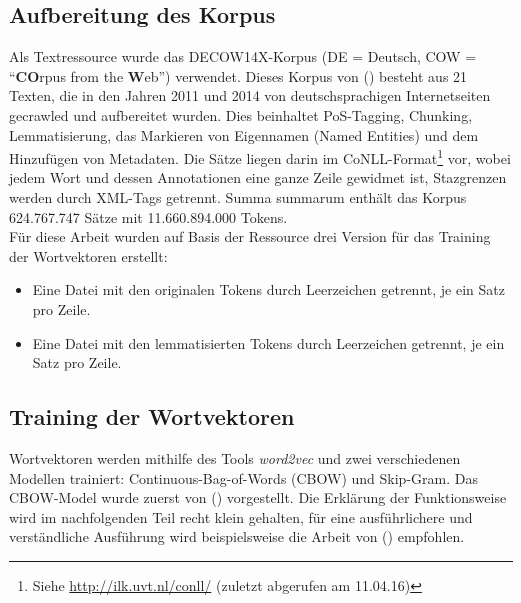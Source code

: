   \subsection{Aufbereitung des Korpus}

  Als Textressource wurde das DECOW14X-Korpus (DE = Deutsch, COW = ``\textbf{CO}rpus from the \textbf{W}eb'') verwendet.
  Dieses Korpus von (\cite{schafer2012building})  besteht aus 21 Texten,
  die in den Jahren 2011 und 2014 von deutschsprachigen Internetseiten gecrawled und aufbereitet wurden. Dies beinhaltet
  PoS-Tagging, Chunking, Lemmatisierung, das Markieren von Eigennamen (Named Entities) und dem Hinzufügen von Metadaten.
  Die Sätze liegen darin im CoNLL-Format\footnote{Siehe \url{http://ilk.uvt.nl/conll/} (zuletzt abgerufen am 11.04.16)} vor,
  wobei jedem Wort und dessen Annotationen eine ganze Zeile gewidmet ist,
  Stazgrenzen werden durch XML-Tags getrennt. Summa summarum enthält das Korpus 624.767.747 Sätze mit 11.660.894.000 Tokens.\\

  Für diese Arbeit wurden auf Basis der Ressource drei Version für das Training der Wortvektoren erstellt:
  \begin{itemize}
      \item Eine Datei mit den originalen Tokens durch Leerzeichen getrennt, je ein Satz pro Zeile.
      \item Eine Datei mit den lemmatisierten Tokens durch Leerzeichen getrennt, je ein Satz pro Zeile.
  \end{itemize}


  \subsection{Training der Wortvektoren}

  Wortvektoren werden mithilfe des Tools \emph{word2vec} und zwei verschiedenen Modellen trainiert: Continuous-Bag-of-Words (CBOW)
  und Skip-Gram. Das CBOW-Model wurde zuerst von (\cite{mikolov2013efficient}) vorgestellt. Die Erklärung der Funktionsweise
  wird im nachfolgenden Teil recht klein gehalten, für eine ausführlichere und verständliche Ausführung wird beispielsweise
  die Arbeit von (\cite{rong2014word2vec}) empfohlen.\\

